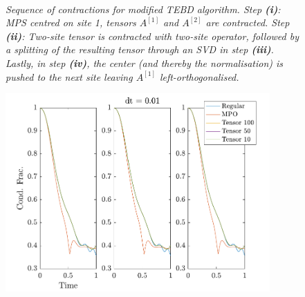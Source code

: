 	
\begin{figure}
\centering %
\begin{subfigure}[b]{0.35\textwidth}
	\caption{}  
  	
\end{subfigure}
\begin{subfigure}[b]{0.35\textwidth}
	\caption{}    
  	
\end{subfigure}
\\ %
\vspace{10mm}
\begin{subfigure}[b]{0.35\textwidth}
	\caption{}    	
  	
\end{subfigure}
\begin{subfigure}[b]{0.35\textwidth}
	\caption{}  
  	
\end{subfigure}
\caption{\textit{Sequence of contractions for modified TEBD algorithm. Step \textbf{(i)}: MPS centred on site 1, tensors $A^{[1]}$ and $A^{[2]}$ are contracted. Step \textbf{(ii)}: Two-site tensor is contracted with two-site operator, followed by a splitting of the resulting tensor through an SVD in step \textbf{(iii)}. Lastly, in step \textbf{(iv)}, the center (and thereby the normalisation) is pushed to the next site leaving $A^{[1]}$ left-orthogonalised.}}
\end{figure}

\begin{figure}[h]
	\centering
	\includegraphics[width=0.9\textwidth]{Figures/TimeEvolve1.pdf}
	\caption{\textit{}}
	\label{fig:TimeEvolve1}
\end{figure}

